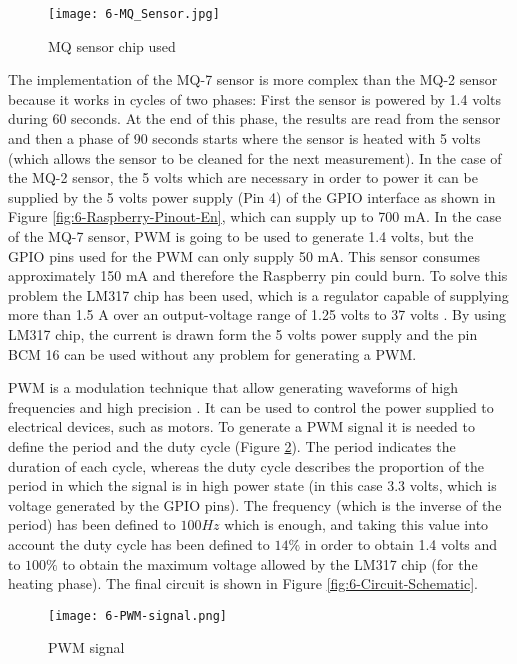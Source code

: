 \begin{figure}[!h]
	\begin{center}
		\texttt{[image: 6-MQ\_Sensor.jpg]}
		\caption{MQ sensor chip used}
		\label{fig:6-MQ_Sensor}
	\end{center}
\end{figure}

The implementation of the MQ-7 sensor is more complex than the MQ-2 sensor because it works in cycles of two phases: First the sensor is powered by 1.4 volts during 60 seconds. At the end of this phase, the results are read from the sensor and then a phase of 90 seconds starts where the sensor is heated with 5 volts (which allows the sensor to be cleaned for the next measurement). In the case of the MQ-2 sensor, the 5 volts which are necessary in order to power it can be supplied by the 5 volts power supply (Pin 4) of the GPIO interface as shown in Figure \ref{fig:6-Raspberry-Pinout-En}, which can supply up to 700 mA. In the case of the MQ-7 sensor, \ac{PWM} is going to be used to generate 1.4 volts, but the GPIO pins used for the \ac{PWM} can only supply 50 mA. This sensor consumes approximately 150 mA and therefore the Raspberry pin could burn. To solve this problem the LM317 chip has been used, which is a regulator capable of supplying more than 1.5 A over an output-voltage range of 1.25 volts to 37 volts \cite{LM317}. By using LM317 chip, the current is drawn form the 5 volts power supply and the pin BCM 16 can be used without any problem for generating a \ac{PWM}.

\ac{PWM} is a modulation technique that allow generating waveforms of high frequencies and high precision \cite{DdlT16}. It can be used to control the power supplied to electrical devices, such as motors. To generate a \ac{PWM} signal it is needed to define the period and the duty cycle (Figure \ref{fig:6-PWM-signal}). The period indicates the duration of each cycle, whereas the duty cycle describes the proportion of the period in which the signal is in high power state (in this case 3.3 volts, which is voltage generated by the GPIO pins). The frequency (which is the inverse of the period) has been defined to $100 Hz$ which is enough, and taking this value into account the duty cycle has been defined to $14\%$ in order to obtain 1.4 volts and to $100\%$ to obtain the maximum voltage allowed by the LM317 chip (for the heating phase). The final circuit is shown in Figure \ref{fig:6-Circuit-Schematic}.

\begin{figure}[!h]
	\begin{center}
		\texttt{[image: 6-PWM-signal.png]}
		\caption{PWM signal}
		\label{fig:6-PWM-signal}
	\end{center}
\end{figure}

